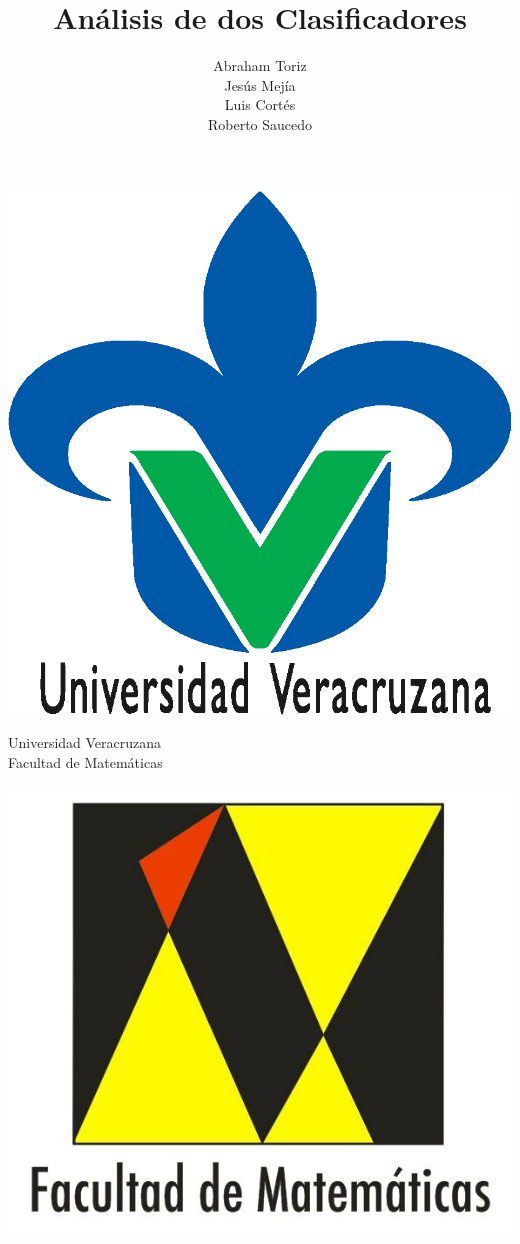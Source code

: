 \documentclass[11pt,letterpaper, reqno]{article}
\title{Análisis de dos Clasificadores}
\author{Abraham Toriz\\ Jesús Mejía\\ Luis Cortés\\ Roberto Saucedo}
\begin{document}
\pagestyle{empty}
\begin{minipage}{.15\textwidth}
	\includegraphics[scale=.22]{uv.eps}
\end{minipage}
\begin{minipage}{.7\textwidth}
\centering
{\huge \sc Universidad Veracruzana}\\
{\LARGE \sc Facultad de Matemáticas}
\end{minipage}
\begin{minipage}{.15\textwidth}
	\begin{flushright}
		\includegraphics[scale=.15]{mateLogo}
	\end{flushright}
\end{minipage}
\end{document}
